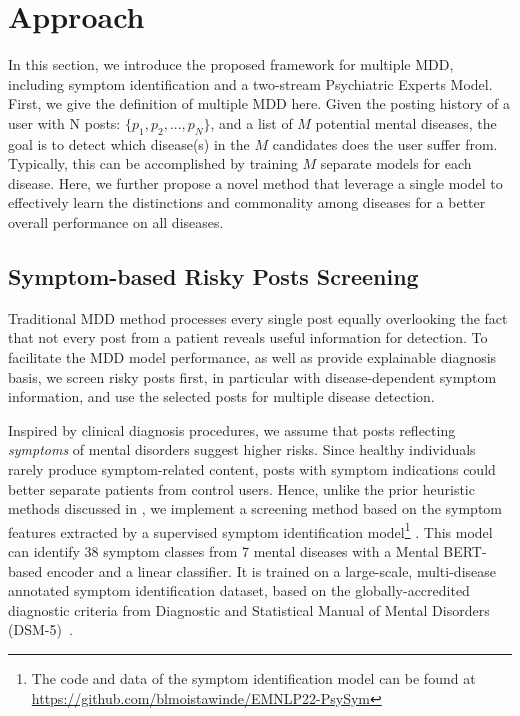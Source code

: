 \section{Approach}
In this section, we introduce the proposed framework for multiple MDD, including symptom identification and a two-stream Psychiatric Experts Model. 
First, we give the definition of multiple MDD here. Given the posting history of a user with N posts: $\{p_1, p_2, ..., p_N\}$, and a list of $M$ potential mental diseases, the goal is to detect which disease(s) in the $M$ candidates does the user suffer from. Typically, this can be accomplished by training $M$ separate models for each disease. Here, we further propose a novel method that leverage a single model to effectively learn the distinctions and commonality among diseases for a better overall performance on all diseases. 

\subsection{Symptom-based Risky Posts Screening}
\label{sec:symp_screen}
Traditional MDD method processes every single post equally overlooking the fact that not every post from a patient reveals useful information for detection. To facilitate the MDD model performance, as well as provide explainable diagnosis basis, we screen risky posts first, in particular with disease-dependent symptom information, and use the selected posts for multiple disease detection. 

Inspired by clinical diagnosis procedures, we assume that posts reflecting \textit{symptoms} of mental disorders suggest higher risks. Since healthy individuals rarely produce symptom-related content, posts with symptom indications could better separate patients from control users. Hence, unlike the prior heuristic methods discussed in 
, we implement a screening method based on the symptom features extracted by a supervised symptom identification model\footnote{The code and data of the symptom identification model can be found at \url{https://github.com/blmoistawinde/EMNLP22-PsySym}} \cite{Zhang2022SymptomIF}.
This model can identify 38 symptom classes from 7 mental diseases with a Mental BERT-based encoder \cite{ji2021mentalbert} and a linear classifier. It is trained on a large-scale, multi-disease annotated symptom identification dataset, based on the globally-accredited diagnostic criteria from Diagnostic and Statistical Manual of Mental Disorders (DSM-5)~\cite{american2013diagnostic}. 

